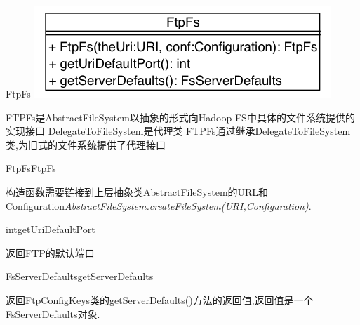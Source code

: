 \begin{XeClass}{FtpFs}
\includegraphics[width=\textwidth]{cdig/FtpFs.png}
     
 FTPFs是AbstractFileSystem以抽象的形式向Hadoop FS中具体的文件系统提供的实现接口
 DelegateToFileSystem是代理类
 FTPFs通过继承DelegateToFileSystem类,为旧式的文件系统提供了代理接口

    \begin{XeMethod}{}{FtpFs}{FtpFs}
         
 构造函数需要链接到上层抽象类AbstractFileSystem的URL和Configuration\emph{AbstractFileSystem.createFileSystem(URI,Configuration)}.

    \end{XeMethod}

    \begin{XeMethod}{\XeProtected}{int}{getUriDefaultPort}
         
 返回FTP的默认端口

    \end{XeMethod}

    \begin{XeMethod}{\XeProtected}{FsServerDefaults}{getServerDefaults}
         
 返回FtpConfigKeys类的getServerDefaults()方法的返回值,返回值是一个FsServerDefaults对象.

    \end{XeMethod}

\end{XeClass}
